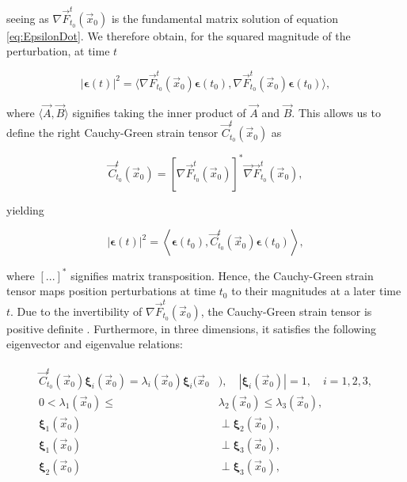 \noindent seeing as $\nabla \vec{F}_{t_0}^t(\vec{x}_0)$ is the fundamental matrix solution of equation \eqref{eq:EpsilonDot}. We therefore obtain, for the squared magnitude of the perturbation, at time $t$

\begin{equation}
	|\bm{\epsilon}(t)|^2 = \langle \nabla\vec{F}_{t_0}^t(\vec{x}_0) \bm{\epsilon}(t_0),\nabla\vec{F}_{t_0}^t(\vec{x}_0) \bm{\epsilon}(t_0)\rangle,
\end{equation}

\noindent where $\langle \vec{A},\vec{B}\rangle$ signifies taking the inner product of $\vec{A}$ and $\vec{B}$. This allows us to define the right Cauchy-Green strain tensor $\vec{C}_{t_0}^t(\vec{x}_0)$ as \citep{Truesdell&Noll}

\begin{equation} \label{eq:Cauchy-Green}
	\vec{C}_{t_0}^{t}(\vec{x}_0) = \left[ \nabla \vec{F}_{t_0}^{t}(\vec{x}_0)		\right]^* \vec{\nabla}\vec{F}_{t_0}^{t}(\vec{x}_0),
\end{equation}

\noindent yielding

\begin{equation}
	|\bm{\epsilon}(t)|^2 = \left\langle \bm{\epsilon}(t_0), \vec{C}_{t_0}^{t}(\vec{x}_0)\bm{\epsilon}(t_0) \right\rangle,
\end{equation}

\noindent where $[...]^*$ signifies matrix transposition. Hence, the Cauchy-Green strain tensor maps position perturbations at time $t_0$ to their magnitudes at a later time $t$. Due to the invertibility of $\nabla \vec{F}_{t_0}^t(\vec{x}_0)$, the Cauchy-Green strain tensor is positive definite \citep{LCSreview}. Furthermore, in three dimensions, it satisfies the following eigenvector and eigenvalue relations:


\begin{align}\label{eq:CGRelations}
\begin{aligned}
	\vec{C}_{t_0}^{t}(\vec{x}_0)\bm{\xi}_i(\vec{x}_0) = \lambda_i(\vec{x}_0)				\bm{\xi}_i(\vec{x}_0&), \quad |\bm{\xi}_i(\vec{x}_0)| = 1, \quad i=1,2,3,  \\
	0 < \lambda_1(\vec{x}_0) \leq& \lambda_2(\vec{x}_0) \leq \lambda_3(\vec{x}_0), \\
	\bm{\xi}_1(\vec{x}_0)& \perp \bm{\xi}_2(\vec{x}_0),\\
	\bm{\xi}_1(\vec{x}_0)& \perp \bm{\xi}_3(\vec{x}_0),\\
	\bm{\xi}_2(\vec{x}_0)& \perp \bm{\xi}_3(\vec{x}_0),
\end{aligned}
\end{align}

